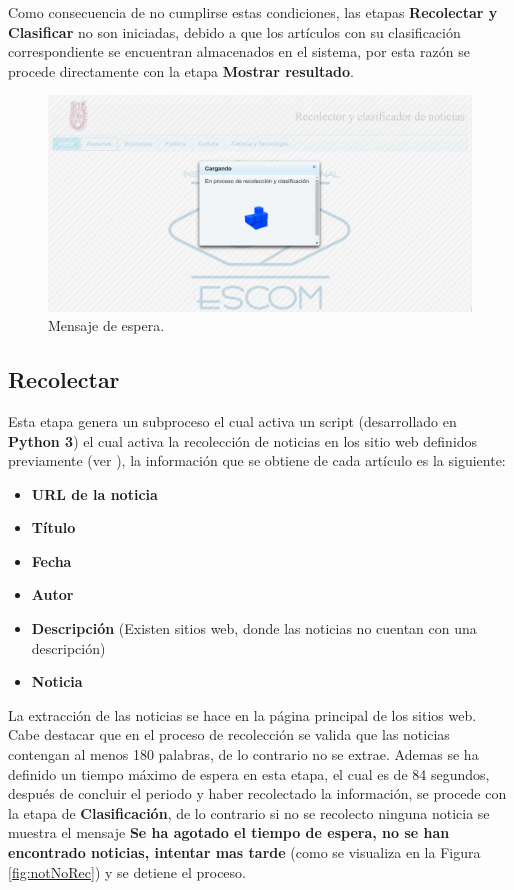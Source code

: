 Como consecuencia de no cumplirse estas condiciones, las etapas \textbf{Recolectar y Clasificar} no son iniciadas, debido a que los artículos con su clasificación correspondiente se encuentran almacenados en el sistema, por esta razón se procede directamente con la etapa \textbf{Mostrar resultado}.\\

\begin{figure}[H]
\centering
\includegraphics[scale=0.29]{imagenes/Capitulo5/mensajeEspera.png}
\caption{Mensaje de espera.}
\label{fig:loading}
\end{figure}


\subsection{Recolectar}


Esta etapa genera un subproceso el cual activa un script (desarrollado en \textbf{Python 3}) el cual activa la recolección de noticias en los sitio web definidos previamente (ver ), la información que se obtiene de cada artículo es la siguiente:

\begin{itemize}
	\item \textbf{URL de la noticia}
	\item \textbf{Título}
	\item \textbf{Fecha}
	\item \textbf{Autor}
	\item \textbf{Descripción} (Existen sitios web, donde las noticias no cuentan con una descripción)
	\item \textbf{Noticia}
\end{itemize}

La extracción de las noticias se hace en la página principal de los sitios web. Cabe destacar que en el proceso de recolección se valida que las noticias contengan al menos 180 palabras, de lo contrario no se extrae. Ademas se ha definido un tiempo máximo de espera en esta etapa, el cual es de 84 segundos, después de concluir el periodo y haber recolectado la información, se procede con la etapa de \textbf{Clasificación}, de lo contrario si no se recolecto ninguna noticia se muestra el mensaje \textbf{Se ha agotado el tiempo de espera, no se han encontrado noticias, intentar mas tarde} (como se visualiza en la Figura \ref{fig:notNoRec}) y se detiene el proceso.

